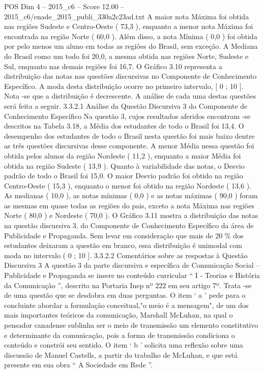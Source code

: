 \begin{textsample}{POS Dim 4 – 2015\_c6 – Score 12.00 – 2015\_c6/enade\_2015\_publi\_330a2c23ad.txt}
A maior nota Máxima foi obtida nas regiões Sudeste e Centro-Oeste ( 73,3 ), enquanto a menor nota Máxima foi encontrada na região Norte ( 60,0 ).
Além disso, a nota Mínima ( 0,0 ) foi obtida por pelo menos um aluno em todas as regiões do Brasil, sem exceção.
A Mediana do Brasil como um todo foi 20,0, a mesma obtida nas regiões Norte, Sudeste e Sul, enquanto nas demais regiões foi 16,7.
O Gráfico 3.10 representa a distribuição das notas nas questões discursivas no Componente de Conhecimento Específico.
A moda desta distribuição ocorre no primeiro intervalo, [ 0 ; 10 ].
Nota -se que a distribuição é decrescente.
A análise de cada uma destas questões será feita a seguir. 3.3.2.1 Análise da Questão Discursiva 3 do Componente de Conhecimento Específico Na questão 3, cujos resultados aferidos encontram -se descritos na Tabela 3.18, a Média dos estudantes de todo o Brasil foi 13,4.
O desempenho dos estudantes de todo o Brasil nesta questão foi mais baixo dentre as três questões discursivas desse componente.
A menor Média nessa questão foi obtida pelos alunos da região Nordeste ( 11,2 ), enquanto a maior Média foi obtida na região Sudeste ( 13,9 ).
Quanto à variabilidade das notas, o Desvio padrão de todo o Brasil foi 15,0.
O maior Desvio padrão foi obtido na região Centro-Oeste ( 15,3 ), enquanto o menor foi obtido na região Nordeste ( 13,6 ).
As medianas ( 10,0 ), as notas mínimas ( 0,0 ) e as notas máximas ( 90,0 ) foram as mesmas em quase todas as regiões do pais, exceto a nota Máxima nas regiões Norte ( 80,0 ) e Nordeste ( 70,0 ).
O Gráfico 3.11 mostra a distribuição das notas na questão discursiva 3, do Componente de Conhecimento Específico da área de Publicidade e Propaganda.
Sem levar em consideração que mais de 20 \% dos estudantes deixaram a questão em branco, essa distribuição é unimodal com moda no intervalo ( 0 ; 10 ]. 3.3.2.2 Comentários sobre as respostas à Questão Discursiva 3 A questão 3 da parte discursiva e específica de Comunicação Social – Publicidade e Propaganda se insere no conteúdo curricular “ I - Teorias e História da Comunicação ”, descrito na Portaria Inep nº 222 em seu artigo 7º.
Trata -se de uma questão que se desdobra em duas perguntas.
O item ‘ a ’ pede para o concluinte abordar a formulação conceitual,"o meio é a mensagem", de um dos mais importantes teóricos da comunicação, Marshall McLuhan, na qual o pensador canadense sublinha ser o meio de transmissão um elemento constitutivo e determinante da comunicação, pois a forma de transmissão condiciona o conteúdo e constrói seu sentido.
O item ‘ b ’ solicita uma reflexão sobre uma discussão de Manuel Castells, a partir do trabalho de McLuhan, e que está presente em sua obra “ A Sociedade em Rede ”.

\end{textsample}
